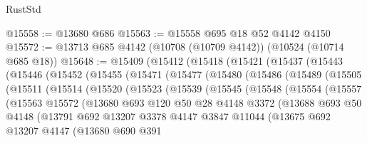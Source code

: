\begin{lexlean}{RustStd}
\begin{coremodule}
@15558 := @13680 @686
@15563 := @15558 @695 @18 @52 @4142 @4150
@15572 := @13713 @685 @4142 (@10708 (@10709 @4142)) (@10524 (@10714 @685 @18))
@15648 := @15409
    (@15412
      (@15418
        (@15421
          (@15437
            (@15443
              (@15446
                (@15452
                  (@15455
                    (@15471
                      (@15477
                        (@15480
                          (@15486
                            (@15489
                              (@15505
                                (@15511
                                  (@15514
                                    (@15520
                                      (@15523
                                        (@15539
                                          (@15545
                                            (@15548
                                              (@15554
                                                (@15557
                                                  (@15563
                                                    @15572
                                                    (@13680
                                                      @693
                                                      @120
                                                      @50
                                                      @28
                                                      @4148
                                                      @3372
                                                      (@13688
                                                        @693
                                                        @50
                                                        @4148
                                                        (@13791
                                                          @692
                                                          @13207
                                                          @3378
                                                          @4147
                                                          @3847
                                                          @11044
                                                          (@13675
                                                            @692
                                                            @13207
                                                            @4147
                                                            (@13680
                                                              @690
                                                              @391

\end{coremodule}
\end{lexlean}
